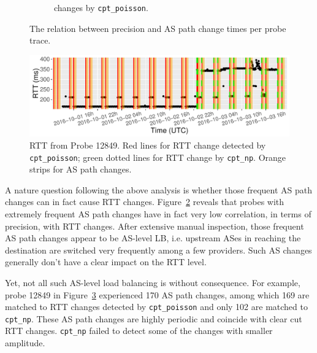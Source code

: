 \begin{figure}[!htb]
\begin{subfigure}[b]{.48\textwidth}
	\caption{\footnotesize changes by \texttt{cpt\_poisson}.}
	\label{fig:as_path_ch_precision_poisson}
	\end{subfigure}
\caption{The relation between precision and AS path change times per probe trace.}
\label{fig:as_path_ch_precision}
\end{figure}

\begin{figure}[!htb]
\centering
\includegraphics[width=.96\textwidth]{gfx/chap4/case_12849.pdf}
\caption{RTT from Probe 12849. Red lines for RTT change detected by \texttt{cpt\_poisson}; green dotted lines for RTT change by \texttt{cpt\_np}. Orange strips for AS path changes.}
\label{fig:case_12849_rtt}
\end{figure}
A nature question following the above analysis is whether those frequent AS path changes can in fact cause RTT changes.
Figure~\ref{fig:as_path_ch_precision} reveals that probes with extremely frequent AS path changes have in fact very low correlation, in terms of precision, with RTT changes.
After extensive manual inspection, those frequent AS path changes appear to be AS-level LB, i.e. upstream ASes in reaching the destination are switched very frequently among a few providers.
Such AS changes generally don't have a clear impact on the RTT level. 


Yet, not all such AS-level load balancing is without consequence. For example, probe 12849 in Figure~\ref{fig:case_12849_rtt} experienced 170 AS path changes, among which 169 are matched to RTT changes detected by \texttt{cpt\_poisson} and only 102 are matched to \texttt{cpt\_np}.
These AS path changes are highly periodic and coincide with clear cut RTT changes.
\texttt{cpt\_np} failed to detect some of the changes with smaller amplitude.

